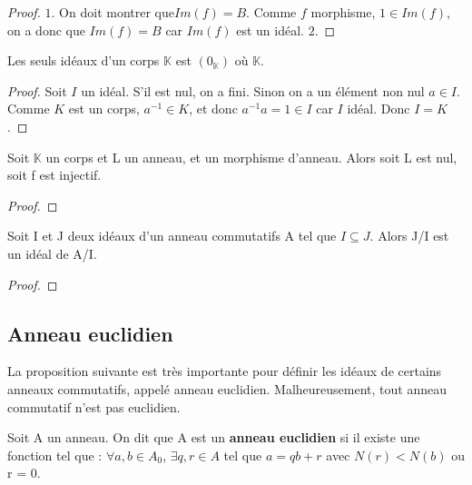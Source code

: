 \begin{proof}
	$1$. On doit montrer que$ Im(f) = B$. Comme $f$ morphisme, $1 \in Im(f)$, on a
	donc que $Im(f) = B$ car $Im(f)$ est un idéal.
	$2$. 
\end{proof}

\begin{proposition}
	Les seuls idéaux d'un corps $\mathbb{K}$ est $(0_{\mathbb{K}})$ où
	$\mathbb{K}$.
\end{proposition}

\begin{proof}
	Soit $I$ un idéal. S'il est nul, on a fini. Sinon on a un élément non
	nul $a \in I$. Comme $K$ est un corps, $a^{-1} \in K$, et donc $a^{-1}a = 1
	\in I$ car $I$ idéal. Donc $I = K$.
\end{proof}

\begin{corollary}
	Soit $\mathbb{K}$ un corps et L un anneau, et
	 un morphisme d'anneau. Alors soit L est nul,
	soit f est injectif.
\end{corollary}

\begin{proof}
	
\end{proof}

\begin{proposition}
	Soit I et J deux idéaux d'un anneau commutatifs A tel que $I \subseteq J$.
	Alors J/I est un idéal de A/I.
\end{proposition}

\begin{proof}
	
\end{proof}

\subsection{Anneau euclidien}

La proposition suivante est très importante pour définir les idéaux de certains
anneaux commutatifs, appelé anneau euclidien. Malheureusement, tout anneau
commutatif n'est pas euclidien.

\begin{definition} 
	Soit A un anneau. On dit que A est un \textbf{anneau euclidien} si il existe
	une fonction  tel que : $\forall a, b \in
	A_{0}$, $\exists q, r \in A$ tel que $a = qb + r$ avec $N(r) < N(b)$ ou r =
	0.
	\label{euclidian_ring}
\end{definition}

